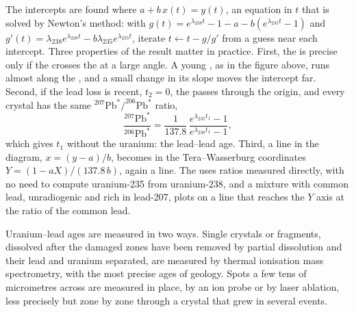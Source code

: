 The intercepts are found where $a + b\,x(t) = y(t)$, an equation in $t$ that is
solved by Newton's method: with $g(t) = e^{\lambda_{238}t} - 1 - a -
b(e^{\lambda_{235}t} - 1)$ and $g'(t) = \lambda_{238}e^{\lambda_{238}t} -
b\lambda_{235}e^{\lambda_{235}t}$, iterate $t \leftarrow t - g/g'$ from a guess
near each intercept. Three properties of the result matter in practice.
First, the  is precise only if the  crosses the
 at a large angle. A young , as in the figure above, runs
almost along the , and a small change in its slope moves the
intercept far. Second, if the lead loss is recent, $t_2 = 0$, the 
passes through the origin, and every crystal has the same
$^{207}\mathrm{Pb}^*/^{206}\mathrm{Pb}^*$ ratio,
\[
\frac{^{207}\mathrm{Pb}^*}{^{206}\mathrm{Pb}^*} = \frac{1}{137.8}\,
\frac{e^{\lambda_{235}t_1} - 1}{e^{\lambda_{238}t_1} - 1},
\]
which gives $t_1$ without the uranium: the lead--lead age. Third, a line in the
 diagram, $x = (y - a)/b$, becomes in the Tera--Wasserburg
coordinates $Y = (1 - aX)/(137.8\,b)$, again a line. The  uses ratios measured directly, with no need to compute uranium-235
from uranium-238, and a mixture with common lead, unradiogenic and rich in
lead-207, plots on a line that reaches the $Y$ axis at the ratio of the common
lead.

Uranium--lead ages are measured in two ways. Single crystals or fragments,
dissolved after the damaged zones have been removed by partial dissolution
and their lead and uranium separated, are measured by thermal ionisation
mass spectrometry, with the most precise ages of geology. Spots a few tens of
micrometres across are measured in place, by an ion probe or by laser
ablation, less precisely but zone by zone through a crystal that grew in
several events.

